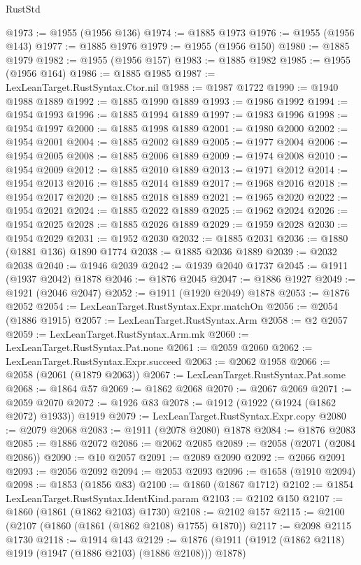 \begin{lexlean}{RustStd}
\begin{coremodule}
@1973 := @1955 (@1956 @136)
@1974 := @1885 @1973
@1976 := @1955 (@1956 @143)
@1977 := @1885 @1976
@1979 := @1955 (@1956 @150)
@1980 := @1885 @1979
@1982 := @1955 (@1956 @157)
@1983 := @1885 @1982
@1985 := @1955 (@1956 @164)
@1986 := @1885 @1985
@1987 := LexLeanTarget.RustSyntax.Ctor.nil
@1988 := @1987 @1722
@1990 := @1940 @1988 @1889
@1992 := @1885 @1990 @1889
@1993 := @1986 @1992
@1994 := @1954 @1993
@1996 := @1885 @1994 @1889
@1997 := @1983 @1996
@1998 := @1954 @1997
@2000 := @1885 @1998 @1889
@2001 := @1980 @2000
@2002 := @1954 @2001
@2004 := @1885 @2002 @1889
@2005 := @1977 @2004
@2006 := @1954 @2005
@2008 := @1885 @2006 @1889
@2009 := @1974 @2008
@2010 := @1954 @2009
@2012 := @1885 @2010 @1889
@2013 := @1971 @2012
@2014 := @1954 @2013
@2016 := @1885 @2014 @1889
@2017 := @1968 @2016
@2018 := @1954 @2017
@2020 := @1885 @2018 @1889
@2021 := @1965 @2020
@2022 := @1954 @2021
@2024 := @1885 @2022 @1889
@2025 := @1962 @2024
@2026 := @1954 @2025
@2028 := @1885 @2026 @1889
@2029 := @1959 @2028
@2030 := @1954 @2029
@2031 := @1952 @2030
@2032 := @1885 @2031
@2036 := @1880 (@1881 @136) @1890 @1774
@2038 := @1885 @2036 @1889
@2039 := @2032 @2038
@2040 := @1946 @2039
@2042 := @1939 @2040 @1737
@2045 := @1911 (@1937 @2042) @1878
@2046 := @1876 @2045
@2047 := @1886 @1927
@2049 := @1921 (@2046 @2047)
@2052 := @1911 (@1920 @2049) @1878
@2053 := @1876 @2052
@2054 := LexLeanTarget.RustSyntax.Expr.matchOn
@2056 := @2054 (@1886 @1915)
@2057 := LexLeanTarget.RustSyntax.Arm
@2058 := @2 @2057
@2059 := LexLeanTarget.RustSyntax.Arm.mk
@2060 := LexLeanTarget.RustSyntax.Pat.none
@2061 := @2059 @2060
@2062 := LexLeanTarget.RustSyntax.Expr.succeed
@2063 := @2062 @1958
@2066 := @2058 (@2061 (@1879 @2063))
@2067 := LexLeanTarget.RustSyntax.Pat.some
@2068 := @1864 @57
@2069 := @1862 @2068
@2070 := @2067 @2069
@2071 := @2059 @2070
@2072 := @1926 @83
@2078 := @1912 (@1922 (@1924 (@1862 @2072) @1933)) @1919
@2079 := LexLeanTarget.RustSyntax.Expr.copy
@2080 := @2079 @2068
@2083 := @1911 (@2078 @2080) @1878
@2084 := @1876 @2083
@2085 := @1886 @2072
@2086 := @2062 @2085
@2089 := @2058 (@2071 (@2084 @2086))
@2090 := @10 @2057
@2091 := @2089 @2090
@2092 := @2066 @2091
@2093 := @2056 @2092
@2094 := @2053 @2093
@2096 := @1658 (@1910 @2094)
@2098 := @1853 (@1856 @83)
@2100 := @1860 (@1867 @1712)
@2102 := @1854 LexLeanTarget.RustSyntax.IdentKind.param
@2103 := @2102 @150
@2107 := @1860 (@1861 (@1862 @2103) @1730)
@2108 := @2102 @157
@2115 := @2100 (@2107 (@1860 (@1861 (@1862 @2108) @1755) @1870))
@2117 := @2098 @2115 @1730
@2118 := @1914 @143
@2129 := @1876 (@1911 (@1912 (@1862 @2118) @1919 (@1947 (@1886 @2103) (@1886 @2108))) @1878)

\end{coremodule}
\end{lexlean}
